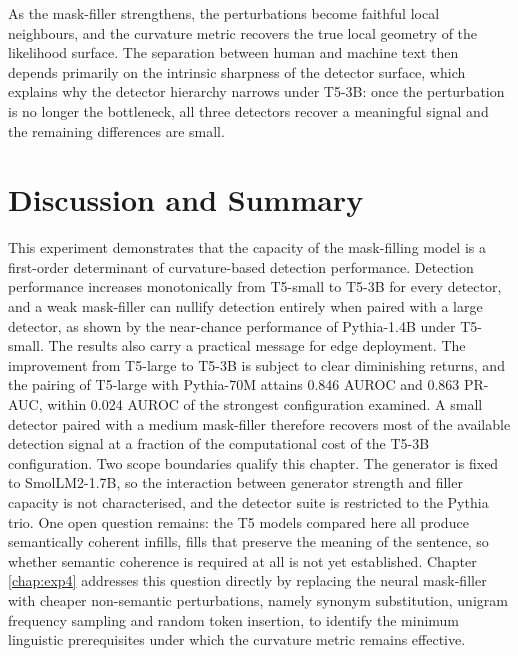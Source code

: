 \documentclass[logo,msc,cs]{infthesis}      %
\begin{document}
As the mask-filler strengthens, the perturbations become faithful local neighbours, and the curvature metric recovers the true local geometry of the likelihood surface. The separation between human and machine text then depends primarily on the intrinsic sharpness of the detector surface, which explains why the detector hierarchy narrows under T5-3B: once the perturbation is no longer the bottleneck, all three detectors recover a meaningful signal and the remaining differences are small.

\section{Discussion and Summary}
\label{sec:exp3_summary}
This experiment demonstrates that the capacity of the mask-filling model is a first-order determinant of curvature-based detection performance. Detection performance increases monotonically from T5-small to T5-3B for every detector, and a weak mask-filler can nullify detection entirely when paired with a large detector, as shown by the near-chance performance of Pythia-1.4B under T5-small.
The results also carry a practical message for edge deployment. The improvement from T5-large to T5-3B is subject to clear diminishing returns, and the pairing of T5-large with Pythia-70M attains 0.846 AUROC and 0.863 PR-AUC, within 0.024 AUROC of the strongest configuration examined. A small detector paired with a medium mask-filler therefore recovers most of the available detection signal at a fraction of the computational cost of the T5-3B configuration.
Two scope boundaries qualify this chapter. The generator is fixed to SmolLM2-1.7B, so the interaction between generator strength and filler capacity is not characterised, and the detector suite is restricted to the Pythia trio. One open question remains: the T5 models compared here all produce semantically coherent infills, fills that preserve the meaning of the sentence, so whether semantic coherence is required at all is not yet established. Chapter \ref{chap:exp4} addresses this question directly by replacing the neural mask-filler with cheaper non-semantic perturbations, namely synonym substitution, unigram frequency sampling and random token insertion, to identify the minimum linguistic prerequisites under which the curvature metric remains effective.
\end{document}

